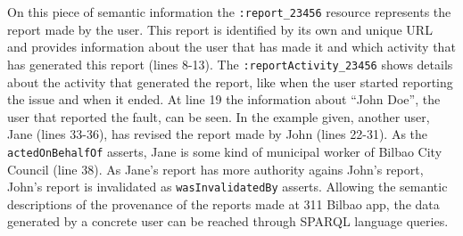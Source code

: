 On this piece of semantic information the \texttt{:report\_23456} resource represents the report made by the user. This report is identified by its own and unique URL and provides information about the user that has made it and which activity that has generated this report (lines 8-13). The \texttt{:reportActivity\_23456} shows details about the activity that generated the report, like when the user started reporting the issue and when it ended. At line 19 the information about ``John Doe'', the user that reported the fault, can be seen. In the example given, another user, Jane (lines 33-36), has revised the report made by John (lines 22-31). As the \texttt{actedOnBehalfOf} asserts, Jane is some kind of municipal worker of Bilbao City Council (line 38). As Jane's report has more authority agains John's report, John's report is invalidated as \texttt{wasInvalidatedBy} asserts. Allowing the semantic descriptions of the provenance of the reports made at 311 Bilbao app, the data generated by a concrete user can be reached through SPARQL \cite{prudhommeaux_sparql_2008} language queries.
